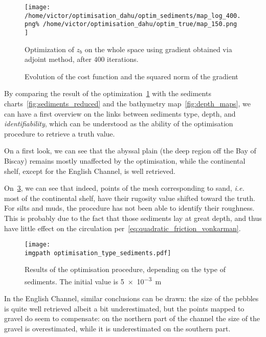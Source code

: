 \documentclass[../../Main_ManuscritThese.tex]{subfiles}
\newcommand{\zob}{z_b}
\newcommand\imgpath{/home/victor/acadwriting/Manuscrit/Text/Chapter5/img/}
\begin{document}
\begin{figure}[ht]
  \centering
  \texttt{[image: /home/victor/optimisation\_dahu/optim\_sediments/map\_log\_400.png\% /home/victor/optimisation\_dahu/optim\_true/map\_150.png
  ]}
  \caption{\label{fig:optimization_map_399} Optimization of $\zob$ on
    the whole space using gradient obtained via adjoint method, after
    $400$ iterations.}
\end{figure}

\begin{figure}[ht]
  \centering
  
  \caption{\label{fig:ctrl_true} Evolution of the cost function and
    the squared norm of the gradient}
\end{figure}
By comparing the result of the
optimization~\cref{fig:optimization_map_399} with the sediments
charts~\cref{fig:sediments_reduced} and the bathymetry
map~\cref{fig:depth_maps}, we can have a first overview on the links
between sediments type, depth, and \emph{identifiability}, which can
be understood as the ability of the optimisation procedure to retrieve
a truth value. 

On a first look, we can see that the abyssal plain (the deep region
off the Bay of Biscay) remains mostly unaffected by the optimisation,
while the continental shelf, except for the English Channel, is
well retrieved. %


On~\cref{fig:optimisation_type_sediments}, we can see that indeed,
points of the mesh corresponding to sand, \emph{i.e.} most of the
continental shelf, have their rugosity value shifted toward the truth.
For silts and muds, the procedure has not been able to identify their
roughness. This is probably due to the fact that those sediments lay
at great depth, and thus have little effect on the circulation
per~\cref{eq:quadratic_friction_vonkarman}.
\begin{figure}[ht]
  \centering
  \texttt{[image: \\imgpath optimisation\_type\_sediments.pdf]}
  \caption{\label{fig:optimisation_type_sediments} Results of the
    optimisation procedure, depending on the type of sediments. The
    initial value is \SI{5e-3}{\meter}}
\end{figure}

In the English Channel, similar conclusions can be drawn: the size of
the pebbles is quite well retrieved albeit a bit
underestimated, but the points mapped to gravel do
seem to compensate: on the northern part of the channel the size of
the gravel is overestimated, while it is underestimated on the
southern part.
\end{document}
